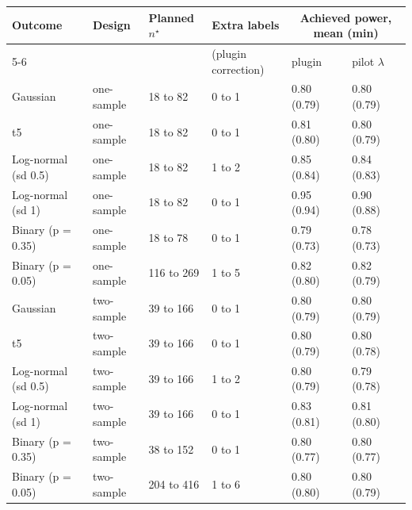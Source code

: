 \begin{tabular}{llllll}
\toprule
Outcome & Design & Planned $n^\star$ & Extra labels & \multicolumn{2}{c}{Achieved power, mean (min)} \\
\cmidrule(lr){5-6}
 & & & (plugin correction) & plugin & pilot $\lambda$ \\
\midrule
Gaussian & one-sample & 18 to 82 & 0 to 1 & 0.80 (0.79) & 0.80 (0.79) \\
t5 & one-sample & 18 to 82 & 0 to 1 & 0.81 (0.80) & 0.80 (0.79) \\
Log-normal (sd 0.5) & one-sample & 18 to 82 & 1 to 2 & 0.85 (0.84) & 0.84 (0.83) \\
Log-normal (sd 1) & one-sample & 18 to 82 & 0 to 1 & 0.95 (0.94) & 0.90 (0.88) \\
Binary (p = 0.35) & one-sample & 18 to 78 & 0 to 1 & 0.79 (0.73) & 0.78 (0.73) \\
Binary (p = 0.05) & one-sample & 116 to 269 & 1 to 5 & 0.82 (0.80) & 0.82 (0.79) \\
Gaussian & two-sample & 39 to 166 & 0 to 1 & 0.80 (0.79) & 0.80 (0.79) \\
t5 & two-sample & 39 to 166 & 0 to 1 & 0.80 (0.79) & 0.80 (0.78) \\
Log-normal (sd 0.5) & two-sample & 39 to 166 & 1 to 2 & 0.80 (0.79) & 0.79 (0.78) \\
Log-normal (sd 1) & two-sample & 39 to 166 & 0 to 1 & 0.83 (0.81) & 0.81 (0.80) \\
Binary (p = 0.35) & two-sample & 38 to 152 & 0 to 1 & 0.80 (0.77) & 0.80 (0.77) \\
Binary (p = 0.05) & two-sample & 204 to 416 & 1 to 6 & 0.80 (0.80) & 0.80 (0.79) \\
\bottomrule
\end{tabular}
